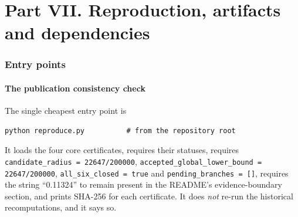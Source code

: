 \part*{Part VII. Reproduction, artifacts and dependencies}
\setcounter{section}{0}

\section{Entry points}

\subsection{The publication consistency check}

The single cheapest entry point is
\begin{verbatim}
python reproduce.py          # from the repository root
\end{verbatim}
It loads the four core certificates, requires their statuses, requires
\texttt{candidate\_\allowbreak{}radius = 22647/\allowbreak{}200000}, \texttt{accepted\_\allowbreak{}global\_\allowbreak{}lower\_\allowbreak{}bound = 22647/\allowbreak{}200000},
\texttt{all\_\allowbreak{}six\_\allowbreak{}closed = true} and \texttt{pending\_\allowbreak{}branches = []}, requires the string
``0.11324'' to remain present in the README's evidence-boundary section, and prints SHA-256 for each
certificate. It does \emph{not} re-run the historical recomputations, and it says so.

